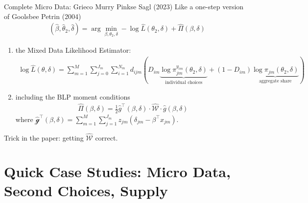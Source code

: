 \begin{frame}{Complete Micro Data: Grieco Murry Pinkse Sagl (2023)}
Like a one-step version of Goolsbee Petrin (2004)
        \begin{align*}
            (\hat{\beta},\hat{\theta}_2,\hat{\delta}) = \arg\min_{\beta,\theta_2,\delta} -\log\hat{L}(\theta_2,\delta)+\hat{\Pi}(\beta,\delta)
        \end{align*}
        \begin{enumerate}
            \item the Mixed Data Likelihood Estimator:
                \begin{align*}
                    \log\hat{L}(\theta,\delta) =\sum_{m=1}^M\sum_{j=0}^{J_m}\sum_{i=1}^{N_m} d_{ijm}(D_{im} \underbrace{\log \pi_{jm}^{y_{im}}(\theta_2,\delta)}_{\text{individual choices}} + (1-D_{im}) \underbrace{\log\pi_{jm}(\theta_2,\delta)}_{\text{aggregate share}})%
                \end{align*}
        \item including the BLP moment conditions
        \begin{align*}
            \hat{\Pi}(\beta,\delta) = \frac{1}{2}\hat{g}^\intercal(\beta,\delta)\cdot \hat{\mathcal{W}}\cdot\hat{g}(\beta,\delta)
        \end{align*}
        where $\hat{\mathcal{g}}^\intercal(\beta,\delta) = \sum_{m=1}^M \sum_{j=1}^{J_m} z_{jm}(\delta_{jm}-\beta^\intercal x_{jm})$.\\
    \end{enumerate}
    Trick in the paper: getting $\hat{\mathcal{W}}$ correct.
\end{frame}



\section*{Quick Case Studies: Micro Data, Second Choices, Supply}


